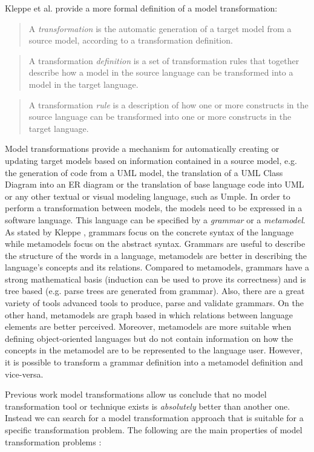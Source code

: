 Kleppe et al. \cite{mccKleppe} provide a more formal definition of a model transformation:
\begin{quote}
A \textit{transformation} is the automatic generation of a target model from a source model, according to a transformation definition. 
\end{quote}
\begin{quote}
A transformation \textit{definition} is a set of transformation rules that together describe how a model in the source language can be transformed into a model in the target language.
\end{quote}
\begin{quote}
A transformation \textit{rule} is a description of how one or more constructs in the source language can be transformed into one or more constructs in the target language.
\end{quote}

Model transformations provide a mechanism for automatically creating or updating target models based on information contained in a source model, e.g. the generation of code from a UML model, the translation of a UML Class Diagram into an ER diagram or the translation of base language code into UML or any other textual or visual modeling language, such as Umple.
In order to perform a transformation between models, the models need to be expressed in a software language. This language can be specified by a \textit{grammar} or a \textit{metamodel}. As stated by Kleppe \cite{kleppe2007language}, grammars focus on the concrete syntax of the language while metamodels focus on the abstract syntax. Grammars are useful to describe the structure of the words in a language, metamodels are better in describing the language's concepts and its relations. Compared to metamodels, grammars have a strong mathematical basis (induction can be used to prove its correctness) and is tree based (e.g. parse trees are generated from grammar). Also, there are a great variety of tools advanced tools to produce, parse and validate grammars. On the other hand, metamodels are graph based in which relations between language elements are better perceived. Moreover, metamodels are more suitable when defining object-oriented languages but do not contain information on how the concepts in the metamodel are to be represented to the language user\cite{kleppe2007language}. However, it is possible to transform a grammar definition into a metamodel definition and vice-versa. 

Previous work \cite{Czarnecki2006, biehl2010literature} model transformations allow us conclude that no model transformation tool or technique exists is \textit{absolutely} better than another one. Instead we can search for a model transformation approach that is suitable for a specific transformation problem. The following are the main properties of model transformation problems \cite{biehl2010literature}:


